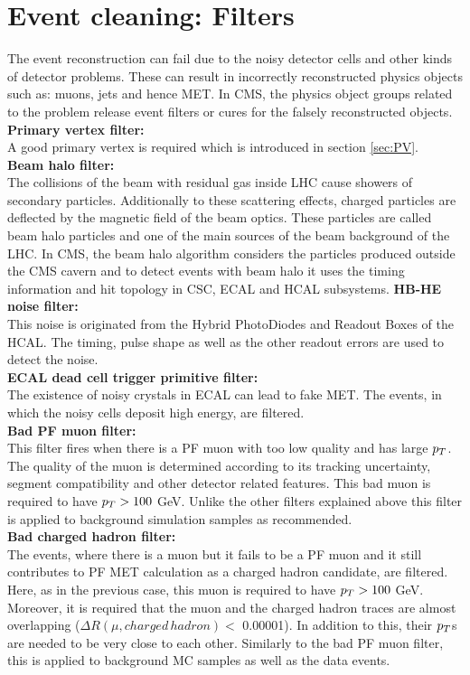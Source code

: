 \section{Event cleaning: Filters}
\label{sec:filters}
The event reconstruction can fail due to the noisy detector cells and other kinds of detector problems. These can result in incorrectly reconstructed physics objects such as: muons, jets and hence MET. In CMS, the physics object groups related to the problem release event filters or cures for the falsely reconstructed objects. \\
\textbf{Primary vertex filter:}\\
A good primary vertex is required which is introduced in section \ref{sec:PV}.\\
\textbf{Beam halo filter:}\\
The collisions of the beam with residual gas inside LHC cause showers of secondary particles. Additionally to these scattering effects, charged particles are deflected by the magnetic field of the beam optics. These particles are called beam halo particles and one of the main sources of the beam background of the LHC. In CMS, the beam halo algorithm considers the particles produced outside the CMS cavern and to detect events with beam halo it uses the timing information and hit topology in CSC, ECAL and HCAL subsystems. 
\textbf{HB-HE noise filter:}\\
This noise is originated from the Hybrid PhotoDiodes and Readout Boxes of the HCAL. The timing, pulse shape as well as the other readout errors are used to detect the noise. \\
\textbf{ECAL dead cell trigger primitive filter:}\\
The existence of noisy crystals in ECAL can lead to fake MET. The events, in which the noisy cells deposit high energy, are filtered.\\
\textbf{Bad PF muon filter:}\\
This filter fires when there is a PF muon with too low quality and has large $p_T$. The quality of the muon is determined according to its tracking uncertainty, segment compatibility and other detector related features. This bad muon is required to have $p_T > 100$ GeV. Unlike the other filters explained above this filter is applied to background simulation samples as recommended. \\
\textbf{Bad charged hadron filter:}\\
The events, where there is a muon but it fails to be a PF muon and it still contributes to PF MET calculation as a charged hadron candidate, are filtered. Here, as in the previous case, this muon is required to have $p_T > 100$ GeV. Moreover, it is required that the muon and the charged hadron traces are almost overlapping ($\Delta R(\mu, charged\, hadron)<$ 0.00001). In addition to this, their $p_T$s are needed to be very close to each other. Similarly to the bad PF muon filter, this is applied to background MC samples as well as the data events. \\

